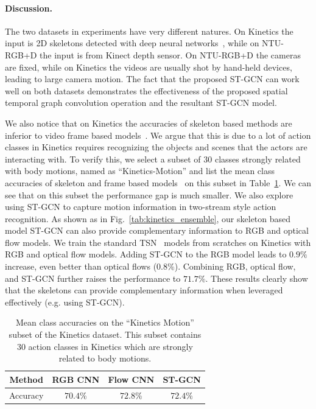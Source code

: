 \documentclass[letterpaper]{article} %
\begin{document}
\paragraph{Discussion.}
The two datasets in experiments have very different natures.
On Kinetics the input is 2D skeletons detected with deep neural networks~\cite{Cao2017CVPR}, while on NTU-RGB+D the input is from Kinect depth sensor.
On NTU-RGB+D the cameras are fixed, while on Kinetics the videos are usually shot by hand-held devices, leading to large camera motion.
The fact that the proposed ST-GCN can work well on both datasets demonstrates the effectiveness of the proposed spatial temporal graph convolution operation and the resultant ST-GCN model.

We also notice that on Kinetics the accuracies of skeleton based methods are inferior to video frame based models~\cite{Kay2017Kinetics}.
We argue that this is due to a lot of action classes in Kinetics requires recognizing the objects and scenes that the actors are interacting with.
To verify this, we select a subset of $ 30 $ classes strongly related with body motions, named as ``Kinetics-Motion'' and list the mean class accuracies of skeleton and frame based models~\cite{Kay2017Kinetics} on this subset in Table~\ref{tab:kinetics_motion}.
We can see that on this subset the performance gap is much smaller.
We also explore using ST-GCN to capture motion information in two-stream style action recognition.
As shown as in Fig.~\ref{tab:kinetics_ensemble}, our skeleton based model ST-GCN can also provide complementary information to RGB and optical flow models.
We train the standard TSN~\cite{TSN2016ECCV} models from scratches on Kinetics with RGB and optical flow models. Adding ST-GCN to the RGB model leads to $0.9\%$ increase, even better than optical flows ($0.8\% $).  Combining RGB, optical flow, and ST-GCN further raises the performance to $71.7\%$.
These results clearly show that the skeletons can provide complementary information when leveraged effectively (e.g. using ST-GCN).


\begin{table}
	\centering
	\begin{tabular}{c|c|c|c}\hline
		Method & RGB CNN & Flow CNN & ST-GCN \\ \hline
		Accuracy & $ 70.4\% $ & $ 72.8\% $ & $72.4\%$ \\ \hline
	\end{tabular}
	\caption{Mean class accuracies on the ``Kinetics Motion'' subset of the Kinetics dataset. This subset contains
	$ 30 $ action classes in Kinetics which are strongly related to body motions.}\label{tab:kinetics_motion}
\end{table}
\end{document}
